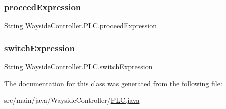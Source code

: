 \subsubsection{\texorpdfstring{proceed\+Expression}{proceedExpression}}
{\footnotesize\ttfamily String Wayside\+Controller.\+P\+L\+C.\+proceed\+Expression\hspace{0.3cm}{\ttfamily [private]}}

\mbox{\label{classWaysideController_1_1PLC_ab6616556bdf225a697db35a4d330024e}} 
\subsubsection{\texorpdfstring{switch\+Expression}{switchExpression}}
{\footnotesize\ttfamily String Wayside\+Controller.\+P\+L\+C.\+switch\+Expression\hspace{0.3cm}{\ttfamily [private]}}



The documentation for this class was generated from the following file\+:\begin{DoxyCompactItemize}
\item 
src/main/java/\+Wayside\+Controller/\hyperlink{PLC_8java}{P\+L\+C.\+java}\end{DoxyCompactItemize}
